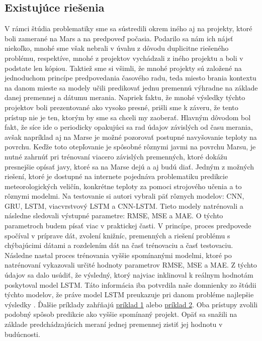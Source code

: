 \subsection{Existujúce riešenia}
V rámci štúdia problematiky sme sa sústredili okrem iného aj na projekty, ktoré boli zamerané na Mars a na predpoveď počasia. Podarilo sa nám ich nájsť niekoľko, mnohé sme však nebrali v úvahu z dôvodu duplicitne riešeného problému, respektíve, mnohé z projektov vychádzali z iného projektu a boli v podstate len kópiou. Taktiež sme si všimli, že mnohé projekty sú založené na jednoduchom princípe predpovedania časového radu, teda miesto brania kontextu na danom mieste sa modely učili predikovať jednu premennú výhradne na základe danej premennej a dátumu merania. Napriek faktu, že mnohé výsledky týchto projektov boli prezentované ako vysoko presné, prišli sme k záveru, že tento prístup nie je ten, ktorým by sme sa chceli my zaoberať. Hlavným dôvodom bol fakt, že síce ide o periodicky opakujúci sa rad údajov závislých od času merania, avšak napríklad aj na Marse je možné pozorovať postupné navyšovanie teploty na povrchu. Keďže toto otepľovanie je spôsobné rôznymi javmi na povrchu Marsu, je nutné zahrnúť pri trénovaní viacero závislých premenných, ktoré dokážu presnejšie opísať javy, ktoré sa na Marse dejú a aj budú diať.
Jedným z možných riešení, ktoré je dostupné na internete pojednáva problematiku predikcie meteorologických veličín, konkrétne teploty za pomoci strojového učenia a to rôznymi modelmi. Na testovanie si autori vybrali päť rôznych modelov: CNN, GRU, LSTM, viacvrstvový LSTM a CNN-LSTM. Tieto modely natrénovali a následne sledovali výstupné parametre: RMSE, MSE a MAE. O týchto parametroch budem písať viac v praktickej časti. V princípe, proces predpovede spočíval v príprave dát, zvolení knižníc, premenných a riešení problému s chýbajúcimi dátami a rozdelením dát na časť trénovaciu a časť testovaciu. Následne nastal proces trénovania vyššie spomínanými modelmi, ktoré po natrénovaní vykazovali určité hodnoty parametrov RMSE, MSE a MAE. Z týchto údajov sa dalo usúdiť, že výsledný, ktorý najviac inklinoval k reálnym hodnotám poskytoval model LSTM. Táto informácia iba potvrdila naše domnienky zo štúdii týchto modelov, že práve model LSTM preukazuje pri danom probléme najlepšie výsledky \cite{mars_prediction_whitepaper}. 
Ďalšie príklady zahŕňajú \href{https://www.inta.es/export/sites/default/.galleries/cpess6-Descarga/de-Cabo-Garcia-A_MARSchine-Learning-Prediction-of-Mars-meteorological-variables-using-artificial-neural-networks.pdf}{príklad 1} alebo \href{https://www.dyna-energia.com/search-content-NT/prediction-of-mars-meteorological-variables-using-artificial-neural-networks-2}{príklad 2}. Oba prístupy zvolili podobný spôsob predikcie ako vyššie spomínaný projekt. Opäť sa snažili na základe predchádzajúcich meraní jednej premennej zistiť jej hodnotu v budúcnosti.
